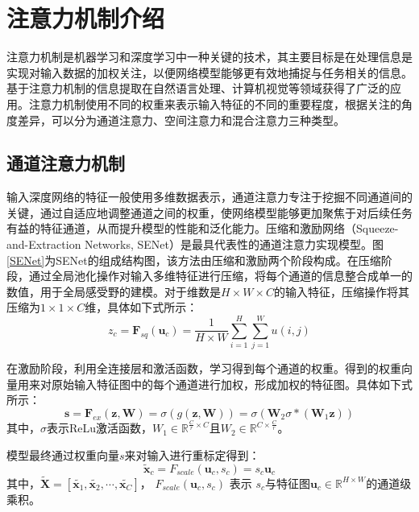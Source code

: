 

\section{注意力机制介绍}
\label{sec:sce3_1}
注意力机制是机器学习和深度学习中一种关键的技术，其主要目标是在处理信息是实现对输入数据的加权关注，以便网络模型能够更有效地捕捉与任务相关的信息。基于注意力机制的信息提取在自然语言处理、计算机视觉等领域获得了广泛的应用。注意力机制使用不同的权重来表示输入特征的不同的重要程度，根据关注的角度差异，可以分为通道注意力、空间注意力和混合注意力三种类型。
\subsection{通道注意力机制}
输入深度网络的特征一般使用多维数据表示，通道注意力专注于挖掘不同通道间的关键，通过自适应地调整通道之间的权重，使网络模型能够更加聚焦于对后续任务有益的特征通道，从而提升模型的性能和泛化能力。压缩和激励网络（Squeeze-and-Extraction Networks, SENet）是最具代表性的通道注意力实现模型。图\ref{SENet}为SENet的组成结构图，该方法由压缩和激励两个阶段构成。在压缩阶段，通过全局池化操作对输入多维特征进行压缩，将每个通道的信息整合成单一的数值，用于全局感受野的建模。对于维数是$H\times W \times C$的输入特征，压缩操作将其压缩为$1 \times 1 \times C$维，具体如下式所示：
\begin{equation}
  z_c=\mathbf{F}_{sq}\left( \mathbf{u}_c \right) =\frac{1}{H\times W}\sum_{i=1}^H{\sum_{j=1}^W{u\left( i,j \right)}}
\end{equation}

在激励阶段，利用全连接层和激活函数，学习得到每个通道的权重。得到的权重向量用来对原始输入特征图中的每个通道进行加权，形成加权的特征图。具体如下式所示：
\begin{equation}
  \mathbf{s}=\mathbf{F}_{ex}\left( \mathbf{z},\mathbf{W} \right) =\sigma \left( g\left( \mathbf{z},\mathbf{W} \right) \right) =\sigma \left( \mathbf{W}_2\sigma *\left( \mathbf{W}_1\mathbf{z} \right) \right)
\end{equation}
其中，$\sigma$表示ReLu激活函数，$W_1 \in \mathbb{R}^{\frac{C}{r}\times C}$且$W_2 \in \mathbb{R}^{C \times \frac{C}{r}}$。

模型最终通过权重向量$s$来对输入进行重标定得到：
\begin{equation}
  \widetilde{\mathbf{x}}_c=F_{scale}\left( \mathbf{u}_c,s_c \right) =s_c\mathbf{u}_c
\end{equation}
其中，$ \widetilde{\mathbf{X}}=\left[ \widetilde{\mathbf{x}_1},\widetilde{\mathbf{x}_2},\cdots ,\widetilde{\mathbf{x}_C} \right] $， $F_{scale}\left( \mathbf{u}_c,s_c \right)$ 表示 $s_c$与特征图$\mathbf{u}_c \in \mathbb{R}^{H\times W}$的通道级乘积。


